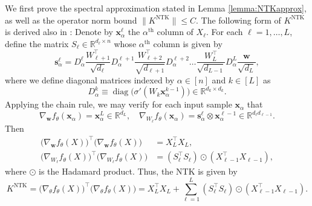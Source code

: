 \documentclass{article}
\theoremstyle{definition}
\newcommand{\R}{\mathbb{R}}
\newcommand{\NTK}{\text{NTK}}
\newcommand{\x}{\mathbf{x}}
\newcommand{\w}{\mathbf{w}}
\newcommand{\s}{\mathbf{s}}
\renewcommand{\a}{\alpha}
\newcommand{\1}{\mathbf{1}}
\newcommand{\diag}{\operatorname{diag}}
\begin{document}
We first prove the spectral approximation stated in
Lemma \ref{lemma:NTKapprox}, as well as the operator norm
bound $\|K^\NTK\| \leq C$. The following form of $K^\NTK$ is derived also
in \cite[Eq.\ (1.7)]{huang2019dynamics}:
Denote by $\x^\ell_\a$ the $\a^\text{th}$ column of $X_\ell$. For each
$\ell=1,\ldots,L$, define the matrix $S_\ell \in \R^{d_\ell \times n}$ whose
$\a^\text{th}$ column is given by
\begin{equation}\label{eq:Sell}
\s^\ell_\a=D^\ell_\a \frac{W_{\ell+1}^\top}{\sqrt{d_\ell}}
D^{\ell+1}_\a \frac{W_{\ell+2}^\top}{\sqrt{d_{\ell+1}}} D^{\ell+2}_\a \ldots
\frac{W_L^\top}{\sqrt{d_{L-1}}}
D^L_\a\frac{\w}{\sqrt{d_L}},
\end{equation}
where we define diagonal matrices indexed by $\a \in [n]$ and $k \in [L]$ as
\[D^k_\a
\equiv \diag\Big(\sigma'(W_k \x^{k-1}_\a)\Big) \in \R^{d_k \times d_k}.\]
Applying the chain rule, we may verify for each input sample $\x_\a$ that
\[\nabla_\w f_\theta(\x_\a)=\x_\a^L \in \R^{d_L},
\quad \nabla_{W_\ell} f_\theta(\x_\a)
=\s_\a^\ell \otimes \x_\a^{\ell-1} \in \R^{d_\ell d_{\ell-1}}.\]
Then
\begin{align*}
\big(\nabla_{\w} f_\theta(X)\big)^\top
\big(\nabla_{\w} f_\theta(X)\big)&=X_L^\top X_L,\\
\big(\nabla_{W_\ell} f_\theta(X)\big)^\top
\big(\nabla_{W_\ell} f_\theta(X)\big)&=(S_\ell^\top S_\ell) \odot
(X_{\ell-1}^\top X_{\ell-1}),
\end{align*}
where $\odot$ is the Hadamard product. Thus, the NTK is given by
\begin{equation}\label{eq:NTKform}
K^{\NTK}=\Big(\nabla_\theta f_\theta(X)\Big)^\top
\Big(\nabla_\theta f_\theta(X)\Big)
=X_L^\top X_L+\sum_{\ell=1}^L (S_\ell^\top S_\ell) \odot
(X_{\ell-1}^\top X_{\ell-1}).
\end{equation}
\end{document}

